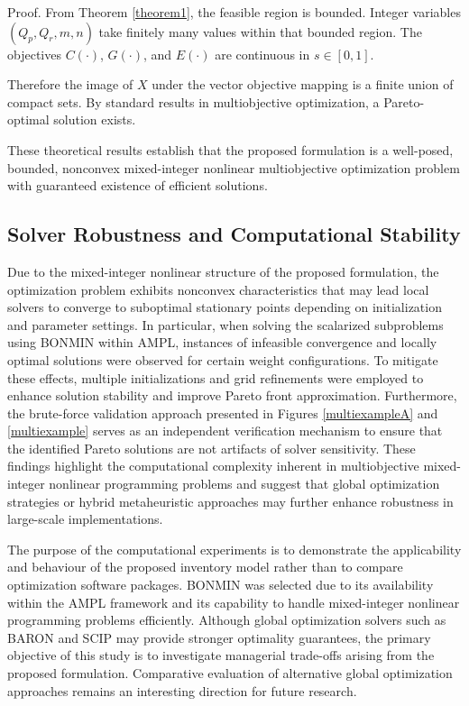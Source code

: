 \documentclass[11pt]{article}
\newcommand{\proofbox}{\hspace{\fill}{$\Box$}}
\newenvironment{proof}{Proof.}{\proofbox}
\begin{document}
\begin{proof}
\noindent From Theorem \ref{theorem1}, the feasible region is bounded.
Integer variables $(Q_p,Q_r,m,n)$ take finitely many values
within that bounded region.
The objectives $C(\cdot)$, $G(\cdot)$, and $E(\cdot)$
are continuous in $s\in[0,1]$.

Therefore the image of $X$ under the vector objective mapping is a finite union of compact sets. By standard results in multiobjective optimization,
a Pareto-optimal solution exists.
\end{proof}

\medskip

These theoretical results establish that the proposed formulation is a well-posed, bounded, nonconvex mixed-integer nonlinear multiobjective optimization problem with guaranteed existence of efficient solutions.

\subsection{Solver Robustness and Computational Stability}
\noindent Due to the mixed-integer nonlinear structure of the proposed formulation, the optimization problem exhibits nonconvex characteristics that may lead local solvers to converge to suboptimal stationary points depending on initialization and parameter settings. In particular, when solving the scalarized subproblems using BONMIN within AMPL, instances of infeasible convergence and locally optimal solutions were observed for certain weight configurations. To mitigate these effects, multiple initializations and grid refinements were employed to enhance solution stability and improve Pareto front approximation. Furthermore, the brute-force validation approach presented in Figures \ref{multiexampleA} and \ref{multiexample} serves as an independent verification mechanism to ensure that the identified Pareto solutions are not artifacts of solver sensitivity. These findings highlight the computational complexity inherent in multiobjective mixed-integer nonlinear programming problems and suggest that global optimization strategies or hybrid metaheuristic approaches may further enhance robustness in large-scale implementations.

\noindent The purpose of the computational experiments is to demonstrate the applicability and behaviour of the proposed inventory model rather than to compare optimization software packages. BONMIN was selected due to its availability within the AMPL framework and its capability to handle mixed-integer nonlinear programming problems efficiently. Although global optimization solvers such as BARON and SCIP may provide stronger optimality guarantees, the primary objective of this study is to investigate managerial trade-offs arising from the proposed formulation. Comparative evaluation of alternative global optimization approaches remains an interesting direction for future research.
\end{document}
